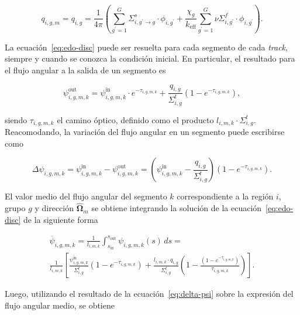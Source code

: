 \documentclass[11pt]{article}
\numberwithin{equation}{section}
\begin{document}
\begin{equation} \label{eq:fuente-isotropica}
 q_{i,g,m} = q_{i,g} = 
 \frac{1}{4\pi} \left(
 \sum_{g^\prime=1}^G \Sigma^s_{i,g^\prime \rightarrow g} \cdot \phi_{i,g^\prime}
 + \frac{\chi_g}{k_{\text{eff}}} \sum_{g^\prime=1}^G \nu\Sigma^f_{i,g^\prime} \cdot \phi_{i,g^\prime}
 \right).
\end{equation}

La ecuación~\eqref{eq:edo-disc} puede ser resuelta para cada segmento de cada \emph{track}, siempre y cuando se conozca la condici\'on inicial. En particular, el resultado para el flujo angular a la salida de un segmento es

\begin{equation}
 \psi^{\text{out}}_{i,g,m,k} = \psi^{\text{in}}_{i,g,m,k} \cdot e^{-\tau_{i,g,m,k}}
 + \frac{q_{i,g}}{\Sigma^t_{i,g}} \left(1 - e^{-\tau_{i,g,m,k}} \right),
\end{equation}

\noindent
siendo $\tau_{i,g,m,k}$ el camino óptico, definido como el producto $l_{i,m,k} \cdot \Sigma^t_{i,g}$. Reacomodando, la variación del flujo angular en un segmento puede escribirse como

\begin{equation} \label{eq:delta-psi}
 \Delta \psi_{i,g,m,k} = 
 \psi^{\text{in}}_{i,g,m,k} - \psi^{\text{out}}_{i,g,m,k} = 
 \left( \psi^{\text{in}}_{i,g,m,k} - \frac{q_{i,g}}{\Sigma^t_{i,g}} \right) \left(1 - e^{-\tau_{i,g,m,k}} \right).
\end{equation}

El valor medio del flujo angular del segmento $k$ correspondiente a la región $i$, grupo $g$ y dirección $\boldsymbol{\hat{\Omega}}_m$ se obtiene integrando la soluci\'on de la ecuación~\eqref{eq:edo-disc} de la siguiente forma

\begin{multline}
 \overline{\psi}_{i,g,m,k} =
 \frac{1}{l_{i,m,k}} \int_{s_{\text{in}}}^{s_{\text{out}}} \psi_{i,g,m,k} (s) \, ds = \\
 \frac{1}{l_{i,m,k}} \left[ \frac{\psi^{\text{in}}_{i,g,m,k}}{\Sigma^t_{i,g}} \left(1 - e^{-\tau_{i,g,m,k}} \right) + \frac{l_{i,m,k} \cdot q_{i,g}}{\Sigma^t_{i,g}} \left( 1 - \frac{\left(1 - e^{-\tau_{i,g,m,k}} \right)}{\tau_{i,g,m,k}} \right) \right].
\end{multline}

\noindent
Luego, utilizando el resultado de la ecuación~\eqref{eq:delta-psi} sobre la expresi\'on del flujo angular medio, se obtiene
\end{document}
